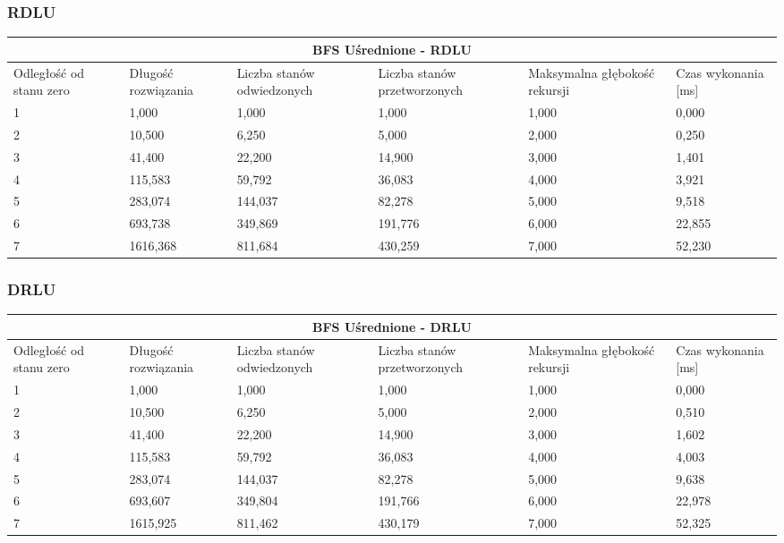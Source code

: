 \documentclass{classrep}
\begin{document}
{\subsubsection{RDLU}
\begin{center}
	\begin{tabular}{ | p{1.6cm} | p{1.4cm} | p{1.8cm} | p{2cm} | p{2.2cm} | p{2cm} | }
	\hline
	\multicolumn{6}{|c|}{BFS Uśrednione - RDLU} \\
	\hline
	Odległość od stanu zero & Długość rozwiązania & Liczba stanów odwiedzonych & Liczba stanów przetworzonych & Maksymalna głębokość rekursji & Czas wykonania [ms]\\
	\hline
	1 & 1,000 & 1,000 & 1,000 & 1,000 & 0,000 \\
	\hline
	2 & 10,500 & 6,250 & 5,000 & 2,000& 0,250 \\
	\hline
	3 & 41,400&	22,200 & 14,900 & 3,000 & 1,401 \\
	\hline
	4 & 115,583 & 59,792 & 36,083 & 4,000 & 3,921 \\
	\hline
	5 & 283,074 & 144,037 &	82,278 & 5,000 & 9,518 \\
	\hline
	6 & 693,738 & 349,869 & 191,776 & 6,000 & 22,855 \\
	\hline
	7 & 1616,368 & 811,684 & 430,259 & 7,000& 52,230 \\
	\hline
	\end{tabular}
\end{center}

\subsubsection{DRLU}
\begin{center}
	\begin{tabular}{ | p{1.6cm} | p{1.4cm} | p{1.8cm} | p{2cm} | p{2.2cm} | p{2cm} | }
	\hline
	\multicolumn{6}{|c|}{BFS Uśrednione - DRLU} \\
	\hline
	Odległość od stanu zero & Długość rozwiązania & Liczba stanów odwiedzonych & Liczba stanów przetworzonych & Maksymalna głębokość rekursji & Czas wykonania [ms]\\
	\hline
	1 & 1,000 & 1,000 & 1,000 & 1,000 & 0,000 \\
	\hline
	2 & 10,500 & 6,250 & 5,000 & 2,000& 0,510 \\
	\hline
	3 & 41,400&	22,200& 14,900 & 3,000 & 1,602 \\
	\hline
	4 & 115,583 & 59,792 & 36,083 & 4,000 & 4,003 \\
	\hline
	5 & 283,074 & 144,037 &	82,278 & 5,000 & 9,638 \\
	\hline
	6 & 693,607 & 349,804 & 191,766 & 6,000 & 22,978 \\
	\hline
	7 & 1615,925 & 811,462 & 430,179 & 7,000& 52,325 \\
	\hline
	\end{tabular}
\end{center}

}
\end{document}
